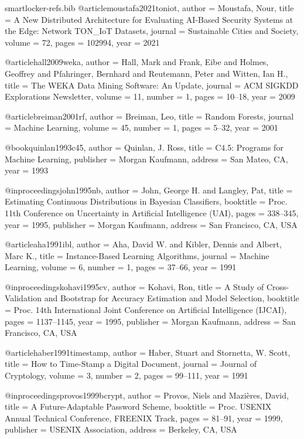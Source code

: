 \begin{filecontents*}[overwrite]{smartlocker-refs.bib}
@article{moustafa2021toniot,
  author  = {Moustafa, Nour},
  title   = {A New Distributed Architecture for Evaluating {AI}-Based Security Systems at the Edge: Network {TON\_IoT} Datasets},
  journal = {Sustainable Cities and Society},
  volume  = {72},
  pages   = {102994},
  year    = {2021}
}

@article{hall2009weka,
  author  = {Hall, Mark and Frank, Eibe and Holmes, Geoffrey and Pfahringer, Bernhard and Reutemann, Peter and Witten, Ian H.},
  title   = {The {WEKA} Data Mining Software: An Update},
  journal = {ACM SIGKDD Explorations Newsletter},
  volume  = {11},
  number  = {1},
  pages   = {10--18},
  year    = {2009}
}

@article{breiman2001rf,
  author  = {Breiman, Leo},
  title   = {Random Forests},
  journal = {Machine Learning},
  volume  = {45},
  number  = {1},
  pages   = {5--32},
  year    = {2001}
}

@book{quinlan1993c45,
  author    = {Quinlan, J. Ross},
  title     = {C4.5: Programs for Machine Learning},
  publisher = {Morgan Kaufmann},
  address   = {San Mateo, CA},
  year      = {1993}
}

@inproceedings{john1995nb,
  author    = {John, George H. and Langley, Pat},
  title     = {Estimating Continuous Distributions in {Bayesian} Classifiers},
  booktitle = {Proc. 11th Conference on Uncertainty in Artificial Intelligence (UAI)},
  pages     = {338--345},
  year      = {1995},
  publisher = {Morgan Kaufmann},
  address   = {San Francisco, CA, USA}
}

@article{aha1991ibl,
  author  = {Aha, David W. and Kibler, Dennis and Albert, Marc K.},
  title   = {Instance-Based Learning Algorithms},
  journal = {Machine Learning},
  volume  = {6},
  number  = {1},
  pages   = {37--66},
  year    = {1991}
}

@inproceedings{kohavi1995cv,
  author    = {Kohavi, Ron},
  title     = {A Study of Cross-Validation and Bootstrap for Accuracy Estimation and Model Selection},
  booktitle = {Proc. 14th International Joint Conference on Artificial Intelligence (IJCAI)},
  pages     = {1137--1145},
  year      = {1995},
  publisher = {Morgan Kaufmann},
  address   = {San Francisco, CA, USA}
}

@article{haber1991timestamp,
  author  = {Haber, Stuart and Stornetta, W. Scott},
  title   = {How to Time-Stamp a Digital Document},
  journal = {Journal of Cryptology},
  volume  = {3},
  number  = {2},
  pages   = {99--111},
  year    = {1991}
}

@inproceedings{provos1999bcrypt,
  author    = {Provos, Niels and Mazi{\`e}res, David},
  title     = {A Future-Adaptable Password Scheme},
  booktitle = {Proc. USENIX Annual Technical Conference, FREENIX Track},
  pages     = {81--91},
  year      = {1999},
  publisher = {USENIX Association},
  address   = {Berkeley, CA, USA}
}


\end{filecontents*}
